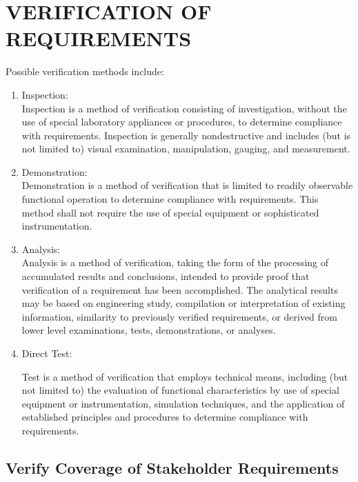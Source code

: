 \section{VERIFICATION OF REQUIREMENTS}

	Possible verification methods include:
	\bigskip
	
	\begin{enumerate}
		\item Inspection:\\

	Inspection is a method of verification consisting of investigation, 
	without the use of special laboratory appliances or procedures, to 
	determine compliance with requirements. Inspection is generally 
	nondestructive and includes (but is not limited to) visual examination, 
	manipulation, gauging, and measurement.

		\item Demonstration:\\

	Demonstration is a method of verification that is limited to readily 
	observable functional operation to determine compliance with 
	requirements. This method shall not require the use of special equipment 
	or sophisticated instrumentation.
	
		\item Analysis:\\

	Analysis is a method of verification, taking the form of the processing of 
	accumulated results and conclusions, intended to provide proof that 
	verification of a requirement has been accomplished. The analytical 
	results may be based on engineering study, compilation or interpretation 
	of existing information, similarity to previously verified requirements, 
	or derived from lower level examinations, tests, demonstrations, or 
	analyses.


		\item Direct Test:

	Test is a method of verification that employs technical means, including (but not 
	limited to) the evaluation of functional characteristics by use of special equipment
	or instrumentation, simulation techniques, and the application of established 
	principles and procedures to determine compliance with requirements.
			
	\end{enumerate}		
	
\subsection{Verify Coverage of Stakeholder Requirements}





